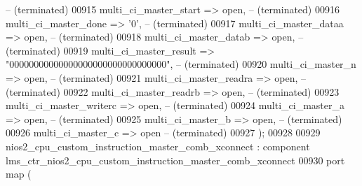 \begin{DoxyCode}
{            --    (terminated)}
00915             multi\_ci\_master\_start     => \textcolor{keywordflow}{open},\textcolor{keyword}{                                                             
            --    (terminated)}
00916             multi\_ci\_master\_done      => '0',\textcolor{keyword}{                                                              
            --    (terminated)}
00917             multi\_ci\_master\_dataa     => \textcolor{keywordflow}{open},\textcolor{keyword}{                                                             
            --    (terminated)}
00918             multi\_ci\_master\_datab     => \textcolor{keywordflow}{open},\textcolor{keyword}{                                                             
            --    (terminated)}
00919             multi\_ci\_master\_result    => "\textcolor{vhdllogic}{00000000000000000000000000000000}",\textcolor{keyword}{                               
            --    (terminated)}
00920             multi\_ci\_master\_n         => \textcolor{keywordflow}{open},\textcolor{keyword}{                                                             
            --    (terminated)}
00921             multi\_ci\_master\_readra    => \textcolor{keywordflow}{open},\textcolor{keyword}{                                                             
            --    (terminated)}
00922             multi\_ci\_master\_readrb    => \textcolor{keywordflow}{open},\textcolor{keyword}{                                                             
            --    (terminated)}
00923             multi\_ci\_master\_writerc   => \textcolor{keywordflow}{open},\textcolor{keyword}{                                                             
            --    (terminated)}
00924             multi\_ci\_master\_a         => \textcolor{keywordflow}{open},\textcolor{keyword}{                                                             
            --    (terminated)}
00925             multi\_ci\_master\_b         => \textcolor{keywordflow}{open},\textcolor{keyword}{                                                             
            --    (terminated)}
00926             multi\_ci\_master\_c         => \textcolor{keywordflow}{open}                                                              
            \textcolor{keyword}{--    (terminated)}
00927         \textcolor{vhdlchar}{)};
00928 
00929     nios2_cpu_custom_instruction_master_comb_xconnect : \textcolor{keywordflow}{component} 
      lms\_ctr\_nios2\_cpu\_custom\_instruction\_master\_comb\_xconnect
00930         \textcolor{keywordflow}{port} \textcolor{keywordflow}{map} (

\end{DoxyCode}
